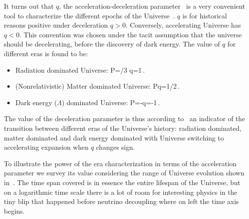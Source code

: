 It turns out that $q$, the acceleration-deceleration parameter~ is a very convenient tool to characterize the different epochs of the Universe~\cite{Rafelski:2013yka}. $q$ is for historical reasons positive under deceleration $q>0$. Conversely, accelerating Universe has $q<0$. This convention was chosen under the tacit assumption that the universe should be decelerating, before the discovery of dark energy. The value of $q$ for different eras is found to be:
\begin{itemize}
\item Radiation dominated Universe: 
P=\rho/3 \implies q=1\,.
\eeqn
\item (Nonrelativistic) Matter dominated Universe: 
P\ll\rho \implies q=1/2\,.
\eeqn
\item Dark energy ($\Lambda$) dominated Universe: 
P=-\rho \implies q=-1\,.
\eeqn
\end{itemize}
The value of the deceleration parameter is thus according to~ an indicator of the transition between different eras of the Universe's history: radiation dominated, matter dominated and dark energy dominated with Universe switching to accelerating expansion when $q$ changes sign.

To illustrate the power of the era characterization in terms of the acceleration parameter we survey its value considering the range of Universe evolution shown in~. The time span covered is in essence the entire lifespan of the Universe, but on a logarithmic time scale there is a lot of room for interesting physics in the tiny blip that happened before neutrino decoupling where on left the time axis begins. 

